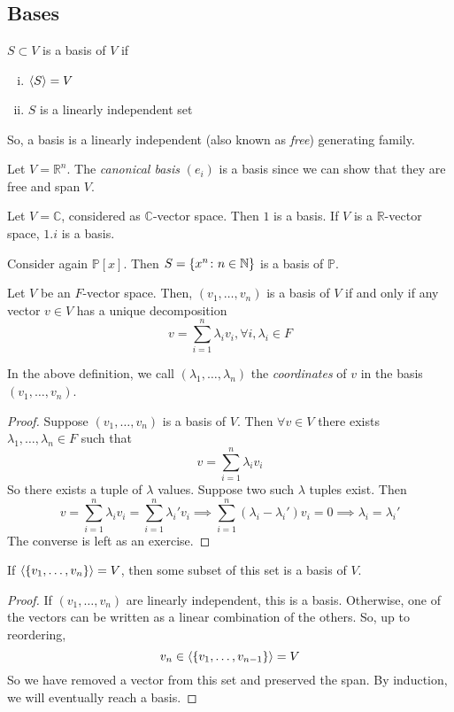\subsection{Bases}
\begin{definition}
	\( S \subset V \) is a basis of \( V \) if
	\begin{enumerate}[(i)]
		\item \( \langle{} S \rangle = V \)
		\item \( S \) is a linearly independent set
	\end{enumerate}
	So, a basis is a linearly independent (also known as \textit{free}) generating family.
\end{definition}
\begin{example}
	Let \( V = \mathbb R^n \).
	The \textit{canonical basis} \( (e_i) \) is a basis since we can show that they are free and span \( V \).
\end{example}
\begin{example}
	Let \( V = \mathbb C \), considered as \( \mathbb C \)-vector space.
	Then \( \qty{1} \) is a basis.
	If \( V \) is a \( \mathbb R \)-vector space, \( \qty{1,i} \) is a basis.
\end{example}
\begin{example}
	Consider again \( \mathbb P[x] \).
	Then \( S = \qty{x^n \colon n \in \mathbb N} \) is a basis of \( \mathbb P \).
\end{example}
\begin{lemma}
	Let \( V \) be an \( F \)-vector space.
	Then, \( (v_1, \dots, v_n) \) is a basis of \( V \) if and only if any vector \( v \in V \) has a unique decomposition
	\[
		v = \sum_{i=1}^n \lambda_i v_i, \forall i, \lambda_i \in F
	\]
\end{lemma}
\begin{remark}
	In the above definition, we call \( (\lambda_1, \dots, \lambda_n) \) the \textit{coordinates} of \( v \) in the basis \( (v_1, \dots, v_n) \).
\end{remark}
\begin{proof}
	Suppose \( (v_1, \dots, v_n) \) is a basis of \( V \).
	Then \( \forall v \in V \) there exists \( \lambda_1, \dots, \lambda_n \in F \) such that
	\[
		v = \sum_{i=1}^n \lambda_i v_i
	\]
	So there exists a tuple of \( \lambda \) values.
	Suppose two such \( \lambda \) tuples exist.
	Then
	\[
		v = \sum_{i=1}^n \lambda_i v_i = \sum_{i=1}^n \lambda_i' v_i \implies \sum_{i=1}^n (\lambda_i - \lambda_i') v_i = 0 \implies \lambda_i = \lambda_i'
	\]
	The converse is left as an exercise.
\end{proof}
\begin{lemma}
	If \( \langle{} \qty{v_1, \dots, v_n} \rangle = V \), then some subset of this set is a basis of \( V \).
\end{lemma}
\begin{proof}
	If \( (v_1, \dots, v_n) \) are linearly independent, this is a basis.
	Otherwise, one of the vectors can be written as a linear combination of the others.
	So, up to reordering,
	\[
		v_n \in \langle{} \qty{v_1, \dots, v_{n-1}} \rangle = V
	\]
	So we have removed a vector from this set and preserved the span.
	By induction, we will eventually reach a basis.
\end{proof}

